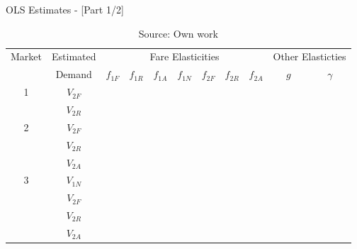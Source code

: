 
\begin{table}[!ht] \centering 
  \caption{OLS Estimates - [Part 1/2]} 
  \label{tbl:ols} 
{\renewcommand\arraystretch{1.25}}
\begin{tabular} {c c ccccccc cc}
\toprule
\multirow{2}{*}{Market} & Estimated  & \multicolumn{7}{c}{Fare Elasticities}                                   & \multicolumn{2}{c}{Other Elasticties} \\
						& Demand     & $f_{1F}$ & $f_{1R}$ & $f_{1A}$ & $f_{1N}$ & $f_{2F}$ & $f_{2R}$ & $f_{2A}$ & $g$ & $\gamma$ \\ 
\hline
\multirow{4}{*}{1}      & \multirow{2}{*}{$V_{2F}$}   & & & & & & & & & \\
													  & & & & & & & & & \\
						\cdashline{2-11}
						& \multirow{2}{*}{$V_{2R}$}   & & & & & & & & & \\
													  & & & & & & & & & \\
\hline
\multirow{6}{*}{2}      & \multirow{2}{*}{$V_{2F}$}   & & & & & & & & & \\
													  & & & & & & & & & \\
						& \multirow{2}{*}{$V_{2R}$}   & & & & & & & & & \\
													  & & & & & & & & & \\
						& \multirow{2}{*}{$V_{2A}$}   & & & & & & & & & \\
													  & & & & & & & & & \\
\hline
\multirow{8}{*}{3}      & \multirow{2}{*}{$V_{1N}$}   & & & & & & & & & \\
													  & & & & & & & & & \\
						& \multirow{2}{*}{$V_{2F}$}   & & & & & & & & & \\
													  & & & & & & & & & \\
						& \multirow{2}{*}{$V_{2R}$}   & & & & & & & & & \\
													  & & & & & & & & & \\
						& \multirow{2}{*}{$V_{2A}$}   & & & & & & & & & \\
													  & & & & & & & & & \\
\bottomrule
\end{tabular}%
\caption*{Source: Own work}
\end{table} 

